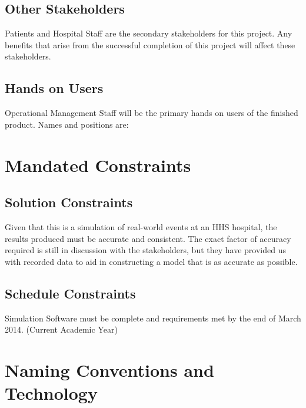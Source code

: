 \documentclass[paper=letter, fontsize=10pt]{scrartcl}
\numberwithin{equation}{section}		%
\numberwithin{figure}{section}			%
\numberwithin{table}{section}				%
\begin{document}
\subsection{Other Stakeholders}
Patients and Hospital Staff are the secondary stakeholders for this project. Any benefits that arise from the successful completion of this project will affect these stakeholders.
\subsection{Hands on Users}
Operational Management Staff will be the primary hands on users of the finished product. Names and positions are:

\section{Mandated Constraints}
\subsection{Solution Constraints}
Given that this is a simulation of real-world events at an HHS hospital, the results produced must be accurate and consistent. The exact factor of accuracy required is still in discussion with the stakeholders, but they have provided us with recorded data to aid in constructing a model that is as accurate as possible.
\subsection{Schedule Constraints}
Simulation Software must be complete and requirements met by the end of March 2014. (Current Academic Year)  


\section{Naming Conventions and Technology}
\end{document}
